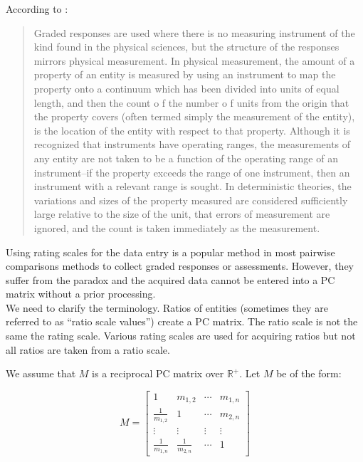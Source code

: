 \documentclass [12pt]{article}
\begin{document}
\noindent According to \cite{DA1995}:
\begin{quote}
Graded responses are used where there is no measuring instrument
of the kind found in the physical sciences, but the structure of the responses mirrors physical measurement. In physical measurement, the amount of a property of an entity
is measured by using an instrument to map the property onto a continuum which has been divided into units of equal length, and then the count o f the number o f units from the origin that the property covers (often termed simply the measurement of the entity), is the location of the entity with respect to that property. Although it is recognized that instruments have operating ranges, the measurements of any entity are not taken to be a function of the operating range of an instrument--if the property exceeds the range of one instrument, then an instrument with a relevant range is sought. In deterministic theories, the variations and sizes of the property measured are considered sufficiently large relative to the size of the unit, that errors of measurement are ignored, and the count is taken immediately as the measurement.
\end{quote}

Using rating scales for the data entry is a popular method in most pairwise comparisons methods to collect graded responses or assessments. However, they suffer from the paradox and the acquired data cannot be entered into a PC matrix without a prior processing. \\

We need to clarify the terminology. Ratios of entities (sometimes they are referred to as ``ratio scale values'') create a PC matrix. The ratio scale is not the same the rating scale. Various rating scales are used for acquiring ratios but not all ratios are taken from a ratio scale.  

We assume that $M$ is a reciprocal PC matrix over $\mathbb{R}^+$. Let $M$ be of the form:

\begin{displaymath}
M = \begin{bmatrix}
1 & m_{1,2} & \cdots & m_{1,n} \\ 
\frac{1}{m_{1,2}} & 1 & \cdots & m_{2,n} \\ 
\vdots & \vdots & \vdots & \vdots \\ 
\frac{1}{m_{1,n}} & \frac{1}{m_{2,n}} & \cdots & 1
\end{bmatrix}
\end{displaymath} \\
\end{document}
